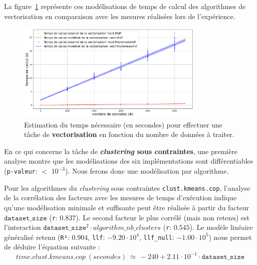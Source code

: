 			La figure~\ref{figure:4.3.2-ETUDE-COUTS-TEMPS-CALCUL-MODELISATION-VECTORIZATION} représente ces modélisations de temps de calcul des algorithmes de vectorisation en comparaison avec les mesures réalisées lors de l'expérience.
			\newline
			\begin{figure}[!htb]
				\centering
				\includegraphics[width=0.8\textwidth]{figures/etude-temps-calcul-modelisation-2vect}
				\caption{Estimation du temps nécessaire (en secondes) pour effectuer une tâche de \textbf{vectorisation} en fonction du nombre de données à traiter.}
				\label{figure:4.3.2-ETUDE-COUTS-TEMPS-CALCUL-MODELISATION-VECTORIZATION}
			\end{figure}
			
			
			En ce qui concerne la tâche de \textbf{\textit{clustering} sous contraintes}, une première analyse montre que les modélisations des six implémentations sont différentiables  (\texttt{p-valeur}: $<$ \texttt{$10^{-3}$}). Nous ferons donc une modélisation par algorithme.
			
			Pour les algorithmes du \textit{clustering} sous contraintes \texttt{clust.kmeans.cop}, l'analyse de la corrélation des facteurs avec les mesures de temps d'exécution indique qu'une modélisation minimale et suffisante peut être réalisée à partir du facteur $\texttt{dataset\_size}$ (\texttt{r}: $0.837$).
			Le second facteur le plus corrélé (mais non retenu) est l'interaction $\texttt{dataset\_size}^{2} \cdot algorithm\_nb\_clusters$ (\texttt{r}: $0.545$).
			Le modèle linéaire généralisé retenu (\texttt{R²}: $0.904$, \texttt{llf}: $-9.20 \cdot 10^{4}$, \texttt{llf\_null}: $-1.00 \cdot 10^{5}$) nous permet de déduire l'équation suivante :
			\begin{equation}
				time.clust.kmeans.cop~(secondes)~
				\simeq~-240 + 2.11 \cdot 10^{-1} \cdot \texttt{dataset\_size}
			\end{equation}
			
